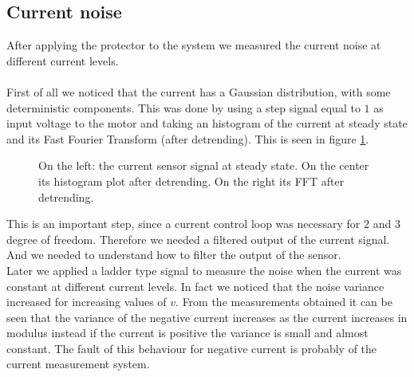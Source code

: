 \subsection{Current noise}
After applying the protector to the system we measured the current noise at different current levels.\\ \\
First of all we noticed that the current has a Gaussian distribution, with some deterministic components. This was done by using a step signal equal to $1$ as input voltage to the motor and taking an histogram of the current at steady state and its Fast Fourier Transform (after detrending). This is seen in figure \ref{fig:currnoise1}. 
  \begin{figure}[!h]
  	\centering
  	\caption{On the left: the current sensor signal at steady state. On the center its histogram plot after detrending. On the right its FFT after detrending.}
  	\label{fig:currnoise1}
  \end{figure}
This is an important step, since a current control loop was necessary for $2$ and $3$ degree of freedom. Therefore we needed a filtered output of the current signal. And we needed to understand how to filter the output of the sensor.
 \\Later we applied a ladder type signal to measure the noise when the current was constant at different current levels. In fact we noticed that the noise variance increased for increasing values of $v$. From the measurements obtained it can be seen that the variance of the negative current increases as the current increases in modulus instead if the current is positive the variance is small and almost constant. The fault of this behaviour for negative current is probably of the current measurement system.\\
